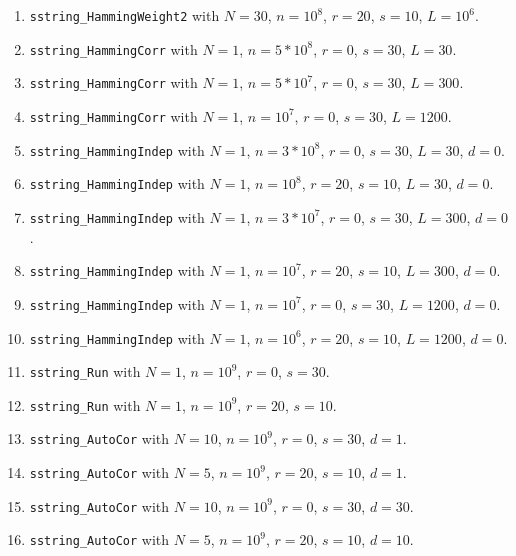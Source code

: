 \begin{enumerate}
  \item {\tt sstring\_HammingWeight2} with $N=30$, $n=10^8$, $r=20$,
   $s=10$, $L=10^6$.

  \item {\tt sstring\_HammingCorr} with $N=1$, $n=5*10^8$, $r=0$,
   $s=30$, $L=30$.

  \item {\tt sstring\_HammingCorr} with $N=1$, $n=5*10^7$, $r=0$,
   $s=30$, $L=300$.

  \item {\tt sstring\_HammingCorr} with $N=1$, $n=10^7$, $r=0$,
   $s=30$, $L=1200$.

  \item {\tt sstring\_HammingIndep} with $N=1$, $n=3*10^8$, $r=0$,
   $s=30$, $L=30$, $d=0$.

  \item {\tt sstring\_HammingIndep} with $N=1$, $n=10^8$, $r=20$,
   $s=10$, $L=30$, $d=0$.

  \item {\tt sstring\_HammingIndep} with $N=1$, $n=3*10^7$, $r=0$,
   $s=30$, $L=300$, $d=0$.

  \item {\tt sstring\_HammingIndep} with $N=1$, $n=10^7$, $r=20$,
   $s=10$, $L=300$, $d=0$.

  \item {\tt sstring\_HammingIndep} with $N=1$, $n=10^7$, $r=0$,
   $s=30$, $L=1200$, $d=0$.

  \item {\tt sstring\_HammingIndep} with $N=1$, $n=10^6$, $r=20$,
   $s=10$, $L=1200$, $d=0$.

  \item {\tt sstring\_Run} with $N=1$, $n=10^9$, $r=0$, $s=30$.

  \item {\tt sstring\_Run} with $N=1$, $n=10^9$, $r=20$, $s=10$.

  \item {\tt sstring\_AutoCor} with $N=10$, $n=10^9$, $r=0$, $s=30$,
  $d=1$.

  \item {\tt sstring\_AutoCor} with $N=5$, $n=10^9$, $r=20$, $s=10$,
  $d=1$.

  \item {\tt sstring\_AutoCor} with $N=10$, $n=10^9$, $r=0$, $s=30$,
  $d=30$.

  \item {\tt sstring\_AutoCor} with $N=5$, $n=10^9$, $r=20$, $s=10$,
  $d=10$.

\end{enumerate}

